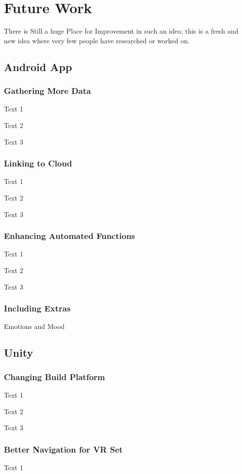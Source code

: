 \chapter{Future Work}
\label{chap:todo}
There is Still a huge Place for Improvement in such an idea; this is a fresh and new idea where very few people have researched or worked on.

\section{Android App}\label{sec:f1}

\subsection{Gathering More Data}\label{sec:f1.1}
Text 1

Text 2

Text 3

\subsection{Linking to Cloud}\label{sec:f1.2}
Text 1

Text 2

Text 3

\subsection{Enhancing Automated Functions}\label{sec:f1.3}
Text 1

Text 2

Text 3

\subsection{Including Extras}\label{sec:f1.4}

Emotions and Mood


\section{Unity}\label{sec:f2}

\subsection{Changing Build Platform}\label{sec:f2.1}
Text 1

Text 2

Text 3

\subsection{Better Navigation for VR Set}\label{sec:f2.2}
Text 1

